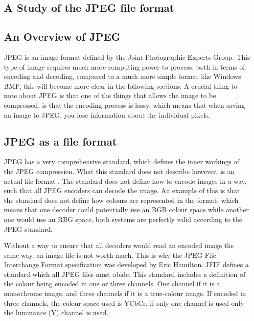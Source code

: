 \begin{infobox}{\section[A Study of the JPEG file format]{A Study of the JPEG file format}}
\label{sec:jpegStudy}

\subsection*{An Overview of JPEG}
JPEG is an image format defined by the Joint Photographic Experts Group. 
This type of image requires much more computing power to process, both in terms of encoding and decoding, compared to a much more simple format like Windows BMP, this will become more clear in the following sections. 
A crucial thing to note about JPEG is that one of the things that allows the image to be compressed, is that the encoding process is lossy, which means that when saving an image to JPEG, you lose information about the individual pixels.

\subsection*{JPEG as a file format}

JPEG has a very comprehensive standard, which defines the inner workings of the JPEG compression. 
What this standard does not describe however, is an actual file format \citep{Miano1999}. 
The standard does not define how to encode images in a way, such that all JPEG encoders can decode the image. 
An example of this is that the standard does not define how colours are represented in the format, which means that one decoder could potentially use an RGB colour space while another one would use an RBG space, both systems are perfectly valid according to the JPEG standard.

Without a way to ensure that all decoders would read an encoded image the same way, an image file is not worth much. This is why the JPEG File Interchange Format specification \citep{JFIFSpecs} was developed by Eric Hamilton. JFIF defines a standard which all JPEG files must abide. This standard includes a definition of the colour being encoded in one or three channels. One channel if it is a monochrome image, and three channels if it is a true-colour image. If encoded in three channels, the colour space used is YCbCr, if only one channel is used only the luminance (Y) channel is used.


\end{infobox}
